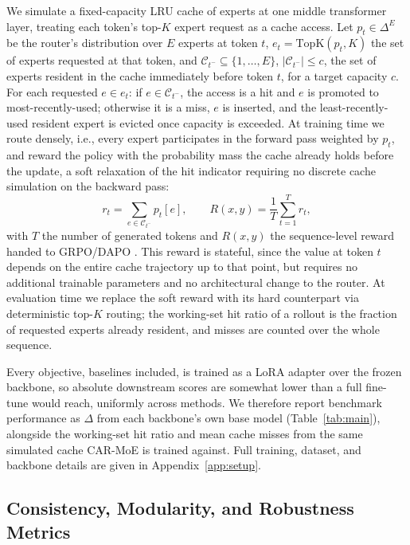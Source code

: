 \documentclass{article}
\begin{document}
We simulate a fixed-capacity LRU cache of experts at one middle transformer layer,
treating each token's top-$K$ expert request as a cache access. Let $p_t \in \Delta^E$ be
the router's distribution over $E$ experts at token $t$, $e_t = \mathrm{TopK}(p_t, K)$ the
set of experts requested at that token, and $\mathcal{C}_{t^-} \subseteq \{1,\dots,E\}$,
$|\mathcal{C}_{t^-}| \le c$, the set of experts resident in the cache immediately before
token $t$, for a target capacity $c$. For each requested $e \in e_t$: if $e \in
\mathcal{C}_{t^-}$, the access is a hit and $e$ is promoted to most-recently-used;
otherwise it is a miss, $e$ is inserted, and the least-recently-used resident expert is
evicted once capacity is exceeded. At training time we route densely, i.e., every expert
participates in the forward pass weighted by $p_t$, and reward the policy with the
probability mass the cache already holds before the update, a soft relaxation of the hit
indicator requiring no discrete cache simulation on the backward pass:
\begin{equation}
  r_t = \sum_{e \in \mathcal{C}_{t^-}} p_t[e],
  \qquad
  R(x,y) = \frac{1}{T}\sum_{t=1}^{T} r_t,
  \label{eq:reward}
\end{equation}
with $T$ the number of generated tokens and $R(x,y)$ the sequence-level reward handed to
GRPO/DAPO \citep{shao2024deepseekmath,yu2025dapo}. This reward is stateful, since the
value at token $t$ depends on the entire cache trajectory up to that point, but requires
no additional trainable parameters and no architectural change to the router. At
evaluation time we replace the soft reward with its hard counterpart via deterministic
top-$K$ routing; the working-set hit ratio of a rollout is the fraction of requested
experts already resident, and misses are counted over the whole sequence.

Every objective, baselines included, is trained as a LoRA adapter over the frozen
backbone, so absolute downstream scores are somewhat lower than a full fine-tune would
reach, uniformly across methods. We therefore report benchmark performance as $\Delta$
from each backbone's own base model (Table~\ref{tab:main}), alongside the working-set hit
ratio and mean cache misses from the same simulated cache CAR-MoE is trained against.
Full training, dataset, and backbone details are given in
Appendix~\ref{app:setup}.

\subsection{Consistency, Modularity, and Robustness Metrics}
\end{document}
